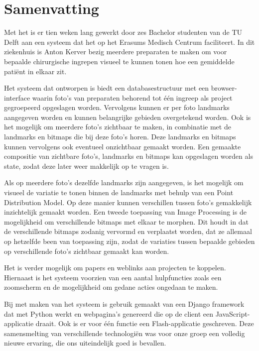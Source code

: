 \section{Samenvatting}

Met het \casamproject is er tien weken lang gewerkt door zes Bachelor studenten van de TU Delft aan een systeem dat het \casamproject op het Erasums Medisch Centrum faciliteert. 
In dit ziekenhuis is Anton Kerver bezig meerdere preparaten te maken om voor bepaalde chirurgische ingrepen visueel te kunnen tonen hoe een gemiddelde pati\"{e}nt in elkaar zit.

Het systeem dat ontworpen is biedt een databasestructuur met een browser-interface waarin foto's van preparaten behorend tot \'{e}\'{e}n ingreep als project gegroepeerd opgeslagen worden. 
Vervolgens kunnen er per foto landmarks aangegeven worden en kunnen belangrijke gebieden overgetekend worden.
Ook is het mogelijk om meerdere foto's zichtbaar te maken, in combinatie met de landmarks en bitmaps die bij deze foto's horen.
Deze landmarks en bitmaps kunnen vervolgens ook eventueel onzichtbaar gemaakt worden.
Een gemaakte compositie van zichtbare foto's, landmarks en bitmaps kan opgeslagen worden als state, zodat deze later weer makkelijk op te vragen is.

Als op meerdere foto's dezelfde landmarks zijn aangegeven, is het mogelijk om visueel de variatie te tonen binnen de landmarks met behulp van een Point Distribution Model. 
Op deze manier kunnen verschillen tussen foto's gemakkelijk inzichtelijk gemaakt worden.
Een tweede toepassing van Image Processing is de mogelijkheid om verschillende bitmaps met elkaar te morphen. 
Dit houdt in dat de verschillende bitmaps zodanig vervormd en verplaatst worden, dat ze allemaal op hetzelfde been van toepassing zijn, zodat de variaties tussen bepaalde gebieden op verschillende foto's zichtbaar gemaakt kan worden.

Het is verder mogelijk om papers en weblinks aan projecten te koppelen.
Hiernaast is het systeem voorzien van een aantal hulpfuncties zoals een zoomscherm en de mogelijkheid om gedane acties ongedaan te maken. 

Bij met maken van het systeem is gebruik gemaakt van een Django framework dat met Python werkt en webpagina's genereerd die op de client een JavaScript-applicatie draait. 
Ook is er voor \'{e}\'{e}n functie een Flash-applicatie geschreven.
Deze samensmelting van verschillende technologi\"{e}n was voor onze groep een volledig nieuwe ervaring, die ons uiteindelijk goed is bevallen.

